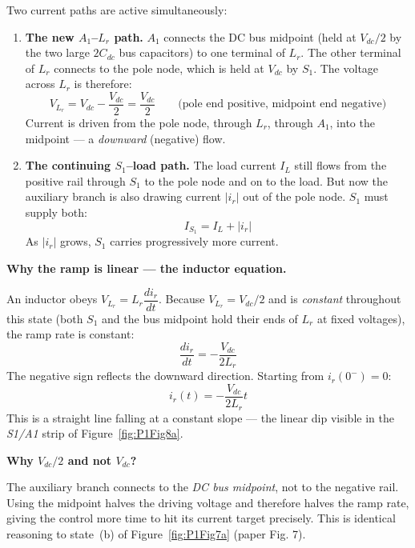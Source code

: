 \documentclass[12pt, a4paper]{article}
\def\,{ }%
\newcommand{\Vdc}{V_{dc}}
\newcommand{\ir}{i_r}
\newcommand{\IL}{I_L}
\newcommand{\Lr}{L_r}
\newcommand{\figref}[1]{Figure~\ref{#1}}
\begin{document}
Two current paths are active simultaneously:
\begin{enumerate}
    \item \textbf{The new $A_1$--$\Lr$ path.}
          $A_1$ connects the DC bus midpoint (held at $\Vdc/2$ by the
          two large $2C_{dc}$ bus capacitors) to one terminal of $\Lr$.
          The other terminal of $\Lr$ connects to the pole node, which
          is held at $\Vdc$ by $S_1$.
          The voltage across $\Lr$ is therefore:
          \[
              V_{\Lr} = \Vdc - \frac{\Vdc}{2} = \frac{\Vdc}{2}
              \qquad\text{(pole end positive, midpoint end negative)}
          \]
          Current is driven from the pole node, through $\Lr$, through
          $A_1$, into the midpoint --- a \emph{downward} (negative)
          flow.

    \item \textbf{The continuing $S_1$--load path.}
          The load current $\IL$ still flows from the positive rail
          through $S_1$ to the pole node and on to the load.
          But now the auxiliary branch is also drawing current
          $|\ir|$ out of the pole node.
          $S_1$ must supply both:
          \[
              I_{S_1} = \IL + |\ir|
          \]
          As $|\ir|$ grows, $S_1$ carries progressively more current.
\end{enumerate}

\medskip
\textbf{Why the ramp is linear --- the inductor equation.}

An inductor obeys $V_{\Lr} = \Lr\,\dfrac{d\ir}{dt}$.
Because $V_{\Lr} = \Vdc/2$ and is \emph{constant} throughout this
state (both $S_1$ and the bus midpoint hold their ends of $\Lr$ at
fixed voltages), the ramp rate is constant:
\begin{equation}
    \frac{d\ir}{dt} = -\frac{\Vdc}{2\Lr}
    \label{eq:boost_ramp_fig8}
\end{equation}
The negative sign reflects the downward direction.
Starting from $\ir(0^-) = 0$:
\begin{equation}
    \ir(t) = -\frac{\Vdc}{2\Lr}\,t
    \label{eq:ir_ramp_fig8}
\end{equation}
This is a straight line falling at a constant slope --- the linear dip
visible in the \textit{S1/A1} strip of \figref{fig:P1Fig8a}.

\medskip
\textbf{Why $\Vdc/2$ and not $\Vdc$?}

The auxiliary branch connects to the \emph{DC bus midpoint}, not to the
negative rail.
Using the midpoint halves the driving voltage and therefore halves the
ramp rate, giving the control more time to hit its current target
precisely.
This is identical reasoning to state~(b) of \figref{fig:P1Fig7a}
(paper Fig.\,7).
\end{document}
